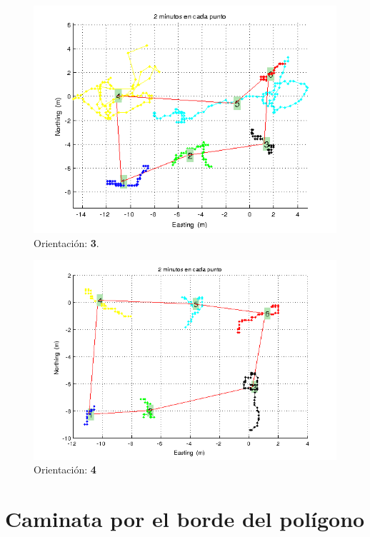 \documentclass[spanish,12pt,a4paper,titlepage]{report}
\begin{document}
\newpage
\begin{figure}[h!]
  \includegraphics[width=1\textwidth]{./img/or2_poly_cut.png}
  \caption{Orientación: \textbf{3}.}
\vspace{-30pt}
  \label{fig:or2_poly_cut.png}
\end{figure}

\begin{figure}[h!]
  \includegraphics[width=.9\textwidth]{./img/or3_pol.png}
  \caption{Orientación: \textbf{4}}
  \label{fig:or3_pol.png}
\end{figure}



\newpage
\section{Caminata por el borde del polígono}
\label{sec:caminata-por-el-borde-del-poligono}
\end{document}
